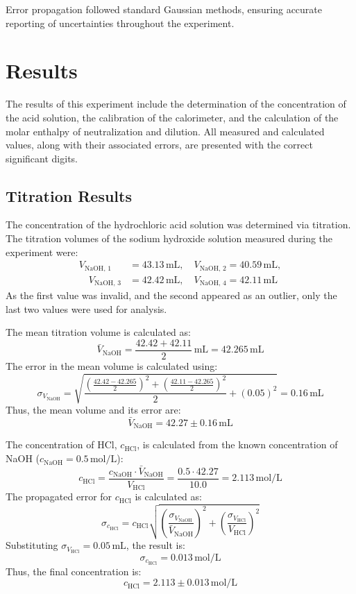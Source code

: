 \documentclass[a4paper,12pt]{article}
\begin{document}
Error propagation followed standard Gaussian methods, ensuring accurate reporting of uncertainties throughout the experiment.


\section{Results}
The results of this experiment include the determination of the concentration of the acid solution, the calibration of the calorimeter, and the calculation of the molar enthalpy of neutralization and dilution. All measured and calculated values, along with their associated errors, are presented with the correct significant digits.

\subsection{Titration Results}
The concentration of the hydrochloric acid solution was determined via titration. The titration volumes of the sodium hydroxide solution measured during the experiment were:
\begin{align*}
V_{\text{NaOH, 1}} &= 43.13 \, \text{mL}, \quad V_{\text{NaOH, 2}} = 40.59 \, \text{mL}, \\ \quad V_{\text{NaOH, 3}} &= 42.42 \, \text{mL}, \quad V_{\text{NaOH, 4}} = 42.11 \, \text{mL}
\end{align*}
As the first value was invalid, and the second appeared as an outlier, only the last two values were used for analysis.

The mean titration volume is calculated as:
\[
\bar{V}_{\text{NaOH}} = \frac{42.42 + 42.11}{2}\,\text{mL} = 42.265 \, \text{mL}
\]
The error in the mean volume is calculated using:
\[
\sigma_{V_{\text{NaOH}}} = \sqrt{\frac{\left(\frac{42.42 - 42.265}{2}\right)^2 + \left(\frac{42.11 - 42.265}{2}\right)^2}{2} + (0.05)^2} = 0.16 \, \text{mL}
\]
Thus, the mean volume and its error are:
\[
\bar{V}_{\text{NaOH}} = 42.27 \pm 0.16 \, \text{mL}
\]

The concentration of HCl, \( c_{\text{HCl}} \), is calculated from the known concentration of NaOH (\( c_{\text{NaOH}} = 0.5 \, \text{mol/L} \)):
\[
c_{\text{HCl}} = \frac{c_{\text{NaOH}} \cdot \bar{V}_{\text{NaOH}}}{V_{\text{HCl}}} = \frac{0.5 \cdot 42.27}{10.0} = 2.113 \, \text{mol/L}
\]
The propagated error for \( c_{\text{HCl}} \) is calculated as:
\[
\sigma_{c_{\text{HCl}}} = c_{\text{HCl}} \sqrt{\left(\frac{\sigma_{V_{\text{NaOH}}}}{\bar{V}_{\text{NaOH}}}\right)^2 + \left(\frac{\sigma_{V_{\text{HCl}}}}{V_{\text{HCl}}}\right)^2}
\]
Substituting \( \sigma_{V_{\text{HCl}}} = 0.05 \, \text{mL} \), the result is:
\[
\sigma_{c_{\text{HCl}}} = 0.013 \, \text{mol/L}
\]
Thus, the final concentration is:
\[
c_{\text{HCl}} = 2.113 \pm 0.013 \, \text{mol/L}
\]
\end{document}
